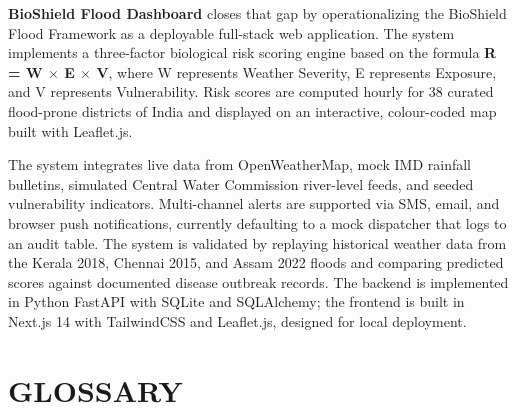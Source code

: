 \documentclass[12pt,a4paper]{report}
\begin{document}
\textbf{BioShield Flood Dashboard} closes that gap by operationalizing the BioShield Flood Framework as a deployable full-stack web application. The system implements a three-factor biological risk scoring engine based on the formula \textbf{R = W $\times$ E $\times$ V}, where W represents Weather Severity, E represents Exposure, and V represents Vulnerability. Risk scores are computed hourly for 38 curated flood-prone districts of India and displayed on an interactive, colour-coded map built with Leaflet.js.

The system integrates live data from OpenWeatherMap, mock IMD rainfall bulletins, simulated Central Water Commission river-level feeds, and seeded vulnerability indicators. Multi-channel alerts are supported via SMS, email, and browser push notifications, currently defaulting to a mock dispatcher that logs to an audit table. The system is validated by replaying historical weather data from the Kerala 2018, Chennai 2015, and Assam 2022 floods and comparing predicted scores against documented disease outbreak records. The backend is implemented in Python FastAPI with SQLite and SQLAlchemy; the frontend is built in Next.js 14 with TailwindCSS and Leaflet.js, designed for local deployment.

\setcounter{page}{4}

\newpage
\tableofcontents
{}

\newpage
\listoffigures
{}

\newpage
\chapter*{GLOSSARY}
\end{document}
